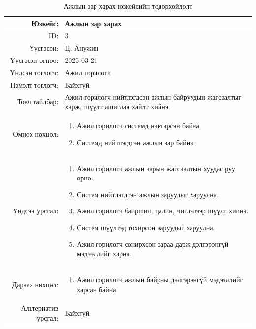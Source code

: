 \begin{longtable}{|r|p{11.5cm}|}
    \caption{Ажлын зар харах юзкейсийн тодорхойлолт}
    \label{table:usecase3}\\ \hline
    {Юзкейс:} & {Ажлын зар харах}\\ \hline
    {ID:} & {3}\\ \hline
    {Үүсгэсэн:} & {Ц. Анужин}\\ \hline
    {Үүсгэсэн огноо:} & {2025-03-21}\\ \hline
    {Үндсэн тоглогч:} & {Ажил горилогч}\\ \hline
    {Нэмэлт тоглогч:} & {Байхгүй}\\ \hline
    {Товч тайлбар:} & {Ажил горилогч нийтлэгдсэн ажлын байруудын жагсаалтыг харж, шүүлт ашиглан хайлт хийнэ.}\\ \hline
    {Өмнөх нөхцөл:} & {\begin{enumerate}[nosep]
        \item Ажил горилогч системд нэвтэрсэн байна.
        \item Системд нийтлэгдсэн ажлын зар байна.
    \end{enumerate}}\\ \hline
    {Үндсэн урсгал:} & {\begin{enumerate}[nosep]
        \item Ажил горилогч ажлын зарын жагсаалтын хуудас руу орно.
        \item Систем нийтлэгдсэн ажлын заруудыг харуулна.
        \item Ажил горилогч байршил, цалин, чиглэлээр шүүлт хийнэ.
        \item Систем шүүлтэд тохирсон заруудыг харуулна.
        \item Ажил горилогч сонирхсон зараа дарж дэлгэрэнгүй мэдээллийг харна.
    \end{enumerate}}\\ \hline
    {Дараах нөхцөл:} & {\begin{enumerate}[nosep]
        \item Ажил горилогч ажлын байрны дэлгэрэнгүй мэдээллийг харсан байна.
    \end{enumerate}}\\ \hline
    {Альтернатив урсгал:} & {Байхгүй}\\ \hline
\end{longtable}

